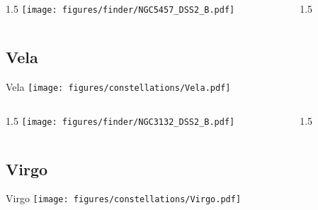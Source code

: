 \documentclass[final]{beamer}
\newlength{\colwidth}
\begin{document}

\begin{frame}[t]{}
  \begin{columns}[T]
    \begin{column}{1.5\colwidth}
      \centering
      \texttt{[image: figures/finder/NGC5457\_DSS2\_B.pdf]}
    \end{column}
    \begin{column}{1.5\colwidth}
      \Large
      
    \end{column}
  \end{columns}
  \vspace{\fill}
\end{frame}

\subsection{Vela}

\begin{frame}[t]{\LARGE Vela}
  \centering
  \texttt{[image: figures/constellations/Vela.pdf]}
\end{frame}


\begin{frame}[t]{}
  \begin{columns}[T]
    \begin{column}{1.5\colwidth}
      \centering
      \texttt{[image: figures/finder/NGC3132\_DSS2\_B.pdf]}
    \end{column}
    \begin{column}{1.5\colwidth}
      \Large
      
    \end{column}
  \end{columns}
  \vspace{\fill}
\end{frame}

\subsection{Virgo}

\begin{frame}[t]{\LARGE Virgo}
  \centering
  \texttt{[image: figures/constellations/Virgo.pdf]}
\end{frame}
\end{document}
